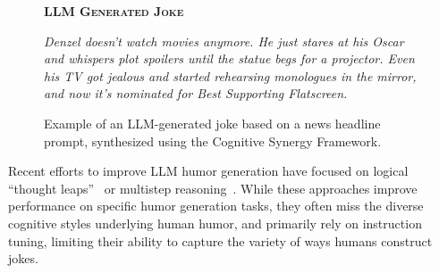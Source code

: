 \documentclass[11pt]{article}
\begin{document}
\begin{figure}[t]
\begin{tcolorbox}[
  enhanced,
  width=0.96\linewidth,
  colback=white,
  colframe=black!12,
  boxrule=0.8pt,
  arc=10pt,
  left=0pt, right=0pt, top=0pt, bottom=8pt,
  shadow={1pt}{-1pt}{0pt}{black!8}
]
\begin{minipage}{0.92\linewidth}
  {\scriptsize\sffamily\bfseries\color{jokebg} \textsc{LLM Generated Joke}} \\[-2pt]
  \begin{tcolorbox}[
    colback=jokebg!6,
    colframe=jokebg,
    leftrule=3pt,
    rightrule=0.4pt,
    toprule=0.4pt,
    bottomrule=0.4pt,
    arc=2pt,
    left=6pt, right=6pt, top=5pt, bottom=5pt,
    after skip=0pt
  ]
    \small\sffamily\itshape
    Denzel doesn't watch movies anymore. He just stares at his Oscar and
    whispers plot spoilers until the statue begs for a projector. Even his TV
    got jealous and started rehearsing monologues in the mirror, and now it's
    nominated for Best Supporting Flatscreen.
  \end{tcolorbox}

  \end{minipage}
  \vspace{2pt}

\end{tcolorbox}
\vspace{-8pt}
\caption{Example of an LLM-generated joke based on a news headline prompt, synthesized using the Cognitive Synergy Framework.}
\label{fig:headline_joke}
\end{figure}

Recent efforts to improve LLM humor generation have focused on logical ``thought leaps''~\cite{zhong_lets_2024} or multistep reasoning~\cite{wang_innovative_2025}. While these approaches improve performance on specific humor generation tasks, they often miss the diverse cognitive styles underlying human humor, and primarily rely on instruction tuning, limiting their ability to capture the variety of ways humans construct jokes.
\end{document}
